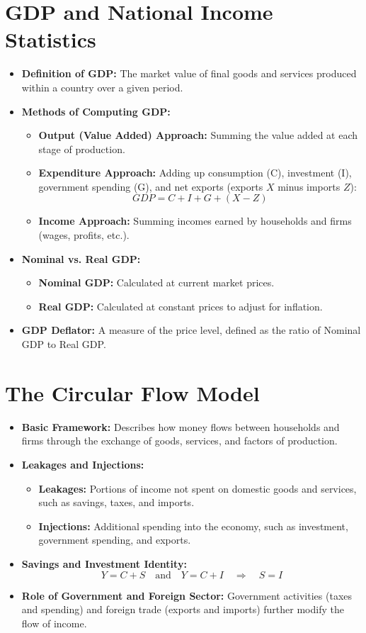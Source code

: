 \section*{GDP and National Income Statistics}
\begin{itemize}
    \item \textbf{Definition of GDP:} The market value of final goods and services produced within a country over a given period.
    \item \textbf{Methods of Computing GDP:}
    \begin{itemize}
        \item \textbf{Output (Value Added) Approach:} Summing the value added at each stage of production.
        \item \textbf{Expenditure Approach:} Adding up consumption (C), investment (I), government spending (G), and net exports (exports $X$ minus imports $Z$):
        \[
        GDP = C + I + G + (X - Z)
        \]
        \item \textbf{Income Approach:} Summing incomes earned by households and firms (wages, profits, etc.).
    \end{itemize}
    \item \textbf{Nominal vs. Real GDP:}
    \begin{itemize}
        \item \textbf{Nominal GDP:} Calculated at current market prices.
        \item \textbf{Real GDP:} Calculated at constant prices to adjust for inflation.
    \end{itemize}
    \item \textbf{GDP Deflator:} A measure of the price level, defined as the ratio of Nominal GDP to Real GDP.
\end{itemize}

\section*{The Circular Flow Model}
\begin{itemize}
    \item \textbf{Basic Framework:} Describes how money flows between households and firms through the exchange of goods, services, and factors of production.
    \item \textbf{Leakages and Injections:}
    \begin{itemize}
        \item \textbf{Leakages:} Portions of income not spent on domestic goods and services, such as savings, taxes, and imports.
        \item \textbf{Injections:} Additional spending into the economy, such as investment, government spending, and exports.
    \end{itemize}
    \item \textbf{Savings and Investment Identity:}
    \[
    Y = C + S \quad \text{and} \quad Y = C + I \quad \Rightarrow \quad S = I
    \]
    \item \textbf{Role of Government and Foreign Sector:} Government activities (taxes and spending) and foreign trade (exports and imports) further modify the flow of income.
\end{itemize}

